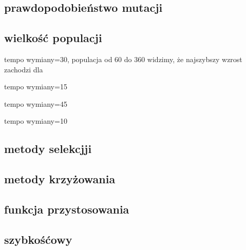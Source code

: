 \documentclass{article}
\begin{document}


\subsection{prawdopodobieństwo mutacji}






\subsection{wielkość populacji}

tempo wymiany=30, populacja od 60 do 360
widzimy, że najszybszy wzrost zachodzi dla










tempo wymiany=15





tempo wymiany=45





tempo wymiany=10





\subsection{metody selekcjji}







\subsection{metody krzyżowania}




\subsection{funkcja przystosowania}






\subsection{szybkośćowy}


\end{document}
